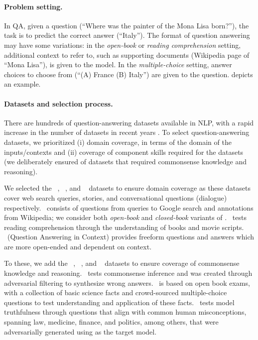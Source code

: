 
\paragraph{Problem setting.}
In QA, given a question (\eg ``Where was the painter of the Mona Lisa born?''), the task is to predict the correct answer (``Italy'').
The format of question answering may have some variations: in the \textit{open-book} or \textit{reading comprehension} setting, additional context to refer to, such as supporting documents (\eg Wikipedia page of ``Mona Lisa''), is given to the model.
In the \textit{multiple-choice} setting, answer choices to choose from (\eg ``(A) France (B) Italy'') are given to the question.
 depicts an example.

\paragraph{Datasets and selection process.}
There are hundreds of question-answering datasets available in NLP, with a rapid increase in the number of datasets in recent years \citep{rogers2021qa}.
To select question-answering datasets, we prioritized (i) domain coverage, in terms of the domain of the inputs/contexts and (ii) coverage of component skills required for the datasets (\eg we deliberately ensured of datasets that required commonsense knowledge and reasoning). 

We selected the \naturalquestions~\citep{kwiatkowski2019natural},  \narrativeqa~\citep{kovcisky2017narrativeqa}, and \quac~\citep{choi2018quac} datasets to ensure domain coverage as these datasets cover web search queries, stories, and conversational questions (\ie dialogue) respectively.
\naturalquestions~consists of questions from queries to Google search and annotations from Wikipedia; we consider both \textit{open-book} and \textit{closed-book} variants of \naturalquestions.
\narrativeqa~tests reading comprehension through the understanding of books and movie scripts.
\quac~(Question Answering in Context) provides freeform questions and answers which are more open-ended and dependent on context.

To these, we add the \hellaswag~\citep{zellers2019hellaswag}, \openbookqa~\citep{mihaylov2018can}, and \truthfulqa~\citep{stephanielin2021trutfulqa} datasets to ensure coverage of commonsense knowledge and reasoning.
\hellaswag~tests commonsense inference and was created through adversarial filtering to synthesize wrong answers.
\openbookqa~is based on open book exams, with a collection of basic science facts and crowd-sourced multiple-choice questions to test understanding and application of these facts.
\truthfulqa~tests model truthfulness through questions that align with common human misconceptions, spanning law, medicine, finance, and politics, among others, that were adversarially generated using \gptdavinci as the target model.

